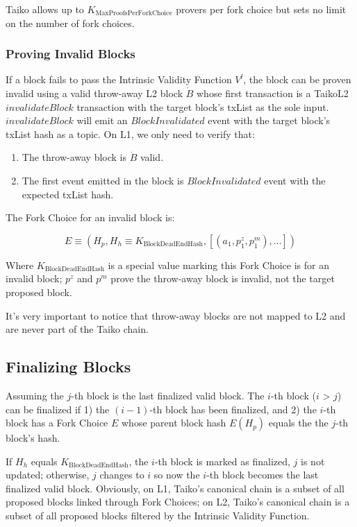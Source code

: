 \documentclass[9pt,oneside]{amsart}
\begin{document}
\begin{multicols}{2}
Taiko allows up to $K_{\mathrm{MaxProofsPerForkChoice}}$ provers per fork choice but sets no limit on the number of fork choices.

\subsubsection{Proving Invalid Blocks} \label{sec:provinginvaid}

If a block fails to pass the Intrinsic Validity Function $V^l$, the block can be proven invalid using a valid throw-away L2 block $\dot{B}$ whose first transaction is a TaikoL2 $invalidateBlock$ transaction with the target block's txList as the sole input. $invalidateBlock$ will emit an $BlockInvalidated$ event with the target block's txList hash as a topic. On L1, we only need to verify that:

\begin{enumerate}
\item The throw-away block is $\dot{B}$ valid.
\item The first event emitted in the block is $BlockInvalidated$ event with the expected txList hash. 
\end{enumerate}

The Fork Choice for an invalid block is:

\begin{equation}
E \equiv (H_p, H_h \equiv K_{\mathrm{BlockDeadEndHash}}, [(a_1, p^{z}_1, p^{m}_1),...])
\end{equation}

Where $K_{\mathrm{BlockDeadEndHash}}$ is a special value marking this Fork Choice is for an invalid block; $p^{z}$ and  $p^{m}$ prove the throw-away block is invalid, not the target proposed block.

It's very important to notice that throw-away blocks are not mapped to L2 and are never part of the Taiko chain.

\subsection{Finalizing Blocks}\label{sec:finalizing}

Assuming the $j$-th block is the last finalized valid block. The $i$-th block ($i$ > $j$) can be finalized if 1) the $(i-1)$-th block has been finalized, and 2) the $i$-th block has a Fork Choice $E$ whose parent block hash $E(H_p)$ equals the the $j$-th block's hash.

If $H_h$ equals $K_{\mathrm{BlockDeadEndHash}}$, the $i$-th block is marked as finalized, $j$ is not updated; otherwise,  $j$ changes to $i$ so now the $i$-th block becomes the last finalized valid block. Obviously, on L1, Taiko's canonical chain is a subset of all proposed blocks linked through Fork Choices; on L2, Taiko's canonical chain is a subset of all proposed blocks filtered by the Intrinsic Validity Function.


\end{multicols}
\end{document}
